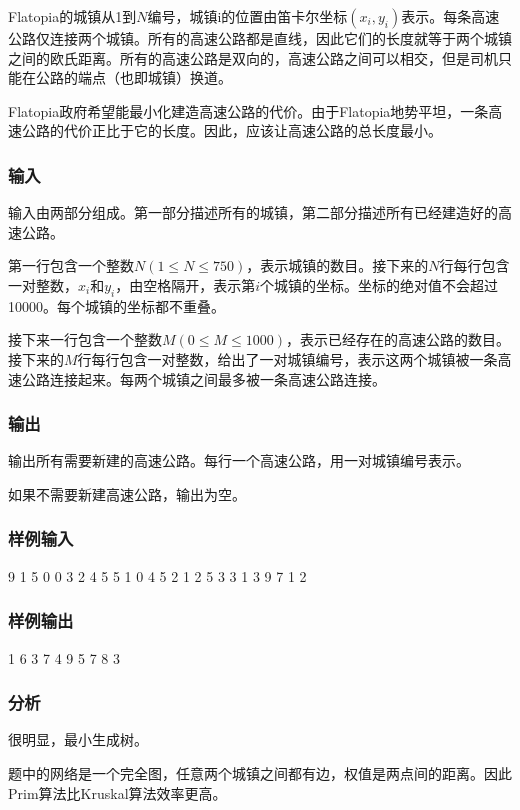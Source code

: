 Flatopia的城镇从1到$N$编号，城镇i的位置由笛卡尔坐标$(x_i,y_i)$表示。每条高速公路仅连接两个城镇。所有的高速公路都是直线，因此它们的长度就等于两个城镇之间的欧氏距离。所有的高速公路是双向的，高速公路之间可以相交，但是司机只能在公路的端点（也即城镇）换道。

Flatopia政府希望能最小化建造高速公路的代价。由于Flatopia地势平坦，一条高速公路的代价正比于它的长度。因此，应该让高速公路的总长度最小。

\subsubsection{输入}
输入由两部分组成。第一部分描述所有的城镇，第二部分描述所有已经建造好的高速公路。

第一行包含一个整数$N(1 \leq N \leq 750)$，表示城镇的数目。接下来的$N$行每行包含一对整数，$x_i$和$y_i$，由空格隔开，表示第$i$个城镇的坐标。坐标的绝对值不会超过10000。每个城镇的坐标都不重叠。

接下来一行包含一个整数$M(0 \leq M \leq 1000)$，表示已经存在的高速公路的数目。接下来的$M$行每行包含一对整数，给出了一对城镇编号，表示这两个城镇被一条高速公路连接起来。每两个城镇之间最多被一条高速公路连接。

\subsubsection{输出}
输出所有需要新建的高速公路。每行一个高速公路，用一对城镇编号表示。

如果不需要新建高速公路，输出为空。

\subsubsection{样例输入}
\begin{Code}
9
1 5
0 0 
3 2
4 5
5 1
0 4
5 2
1 2
5 3
3
1 3
9 7
1 2
\end{Code}

\subsubsection{样例输出}
\begin{Code}
1 6
3 7
4 9
5 7
8 3
\end{Code}

\subsubsection{分析}
很明显，最小生成树。

题中的网络是一个完全图，任意两个城镇之间都有边，权值是两点间的距离。因此Prim算法比Kruskal算法效率更高。

